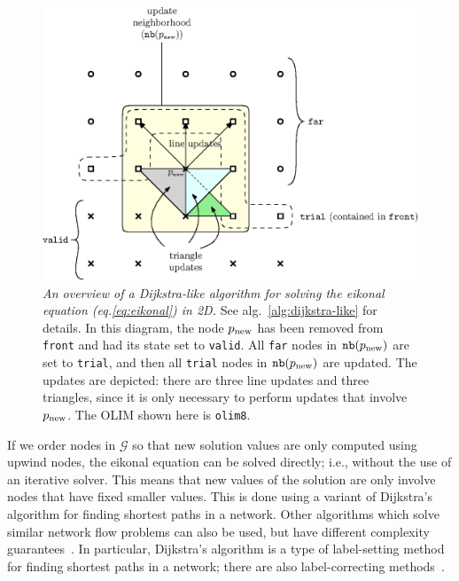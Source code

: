 \documentclass[smallcondensed]{svjour3}
\begin{document}
\begin{figure}[t]
  \centering
  \includegraphics[width=0.9\linewidth]{overview-2.eps}
  \caption{\emph{An overview of a Dijkstra-like algorithm for solving
      the eikonal equation (eq.\@ \ref{eq:eikonal}) in 2D.} See alg.\
    \ref{alg:dijkstra-like} for details. In this diagram, the node
    $p_{\operatorname{new}}$ has been removed from \texttt{front} and had its state set
    to \texttt{valid}. All \texttt{far} nodes in $\texttt{nb}(p_{\operatorname{new}})$ are
    set to \texttt{trial}, and then all \texttt{trial} nodes in
    $\texttt{nb}(p_{\operatorname{new}})$ are updated. The updates are depicted: there are
    three line updates and three triangles, since it is only necessary
    to perform updates that involve $p_{\operatorname{new}}$. The OLIM shown here is
    \texttt{olim8}.}
  \label{fig:overview}
\end{figure}

If we order nodes in $\mathcal{G}$ so that new solution values are
only computed using upwind nodes, the eikonal equation can be solved
directly; i.e., without the use of an iterative solver. This means
that new values of the solution are only involve nodes that have fixed
smaller values. This is done using a variant of Dijkstra's algorithm
for finding shortest paths in a network. Other algorithms which solve
similar network flow problems can also be used, but have different
complexity guarantees~\cite{chacon2012fast}. In particular, Dijkstra's
algorithm is a type of label-setting method for finding shortest paths
in a network; there are also label-correcting
methods~\cite{bertsekas1998network}.
\end{document}
